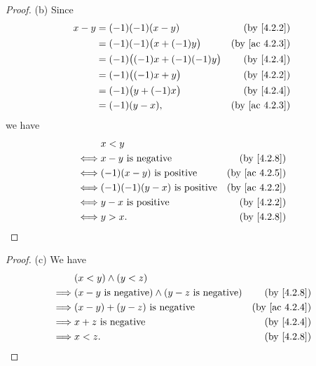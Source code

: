 \begin{proof}{(b)}
  Since
  \begin{align*}
    x - y & = (-1)(-1)(x - y)                 & \text{(by \cref{4.2.2})}    \\
          & = (-1)(-1)\big(x + (-1)y\big)     & \text{(by \cref{ac 4.2.3})} \\
          & = (-1)\big((-1)x + (-1)(-1)y\big) & \text{(by \cref{4.2.4})}    \\
          & = (-1)\big((-1)x + y\big)         & \text{(by \cref{4.2.2})}    \\
          & = (-1)\big(y + (-1)x\big)         & \text{(by \cref{4.2.4})}    \\
          & = (-1)(y - x),                    & \text{(by \cref{ac 4.2.3})}
  \end{align*}
  we have
  \begin{align*}
         & x < y                                                             \\
    \iff & x - y \text{ is negative}           & \text{(by \cref{4.2.8})}    \\
    \iff & (-1)(x - y) \text{ is positive}     & \text{(by \cref{ac 4.2.5})} \\
    \iff & (-1)(-1)(y - x) \text{ is positive} & \text{(by \cref{ac 4.2.2})} \\
    \iff & y - x \text{ is positive}           & \text{(by \cref{4.2.2})}    \\
    \iff & y > x.                              & \text{(by \cref{4.2.8})}
  \end{align*}
\end{proof}

\begin{proof}{(c)}
  We have
  \begin{align*}
             & (x < y) \land (y < z)                                                                       \\
    \implies & (x - y \text{ is negative}) \land (y - z \text{ is negative}) & \text{(by \cref{4.2.8})}    \\
    \implies & (x - y) + (y - z) \text{ is negative}                         & \text{(by \cref{ac 4.2.4})} \\
    \implies & x + z \text{ is negative}                                     & \text{(by \cref{4.2.4})}    \\
    \implies & x < z.                                                        & \text{(by \cref{4.2.8})}
  \end{align*}
\end{proof}

